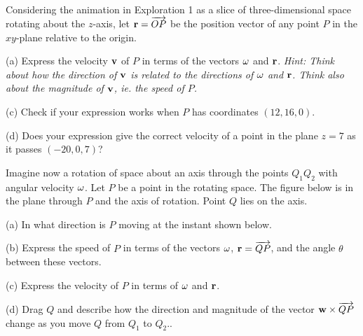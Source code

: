 \documentclass{ximera}
\begin{document}
\begin{question}  \label{Qnjy55:Cross}
Considering the animation in Exploration 1 as a slice of three-dimensional space rotating about the $z$-axis, let ${\bf r} = \overrightarrow{OP}$ be the position vector of any point $P$ in the $xy$-plane relative to the origin.

(a) Express the velocity ${\bf v}$ of $P$ in terms of the vectors ${\bf\omega}$ and ${\bf r}$. \it{Hint:} Think about how the direction of ${\bf v}$ is related to the directions of ${\bf \omega}$ and ${\bf r}$. Think also about the magnitude of ${\bf v}$, ie. the speed of $P$.

(c) Check if your expression works when $P$ has coordinates $(12, 16,0)$.

(d) Does your expression give the correct velocity of a point in the plane $z=7$ as it passes $(-20,0,7)$?


\end{question}


\begin{question}  \label{Qdstjigvgf:Cross}
Imagine now a rotation of space about an axis through the points $Q_1Q_2$ with angular velocity ${\bf \omega}$. Let $P$ be a point in the rotating space. The figure below is in the plane through $P$ and the axis of rotation. Point $Q$ lies on the axis.

(a) In what direction is $P$ moving at the instant shown below.

(b) Express the speed of $P$ in terms of the vectors ${\bf \omega}$, ${\bf r} = \overrightarrow{QP}$, and the angle $\theta$ between these vectors.

(c) Express the velocity of $P$ in terms of ${\bf \omega}$ and ${\bf r}$.

(d) Drag $Q$ and describe how the direction and magnitude of the vector ${\bf w}\times {\overrightarrow{QP}}$ change as you move $Q$ from $Q_1$ to $Q_2$..


 
\begin{onlineOnly}
    \begin{center}
\end{center}
\end{onlineOnly}

\end{question}
\end{document}
